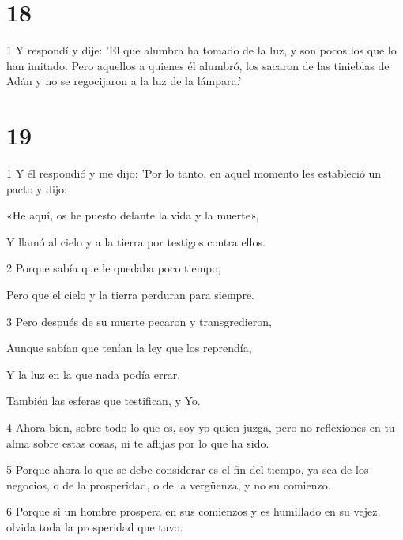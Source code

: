 \chapter{18}

\par 1 Y respondí y dije: 'El que alumbra ha tomado de la luz, y son pocos los que lo han imitado. Pero aquellos a quienes él alumbró, los sacaron de las tinieblas de Adán y no se regocijaron a la luz de la lámpara.'

\chapter{19}

\par 1 Y él respondió y me dijo: 'Por lo tanto, en aquel momento les estableció un pacto y dijo:

\par «He aquí, os he puesto delante la vida y la muerte»,

\par Y llamó al cielo y a la tierra por testigos contra ellos.

\par 2 Porque sabía que le quedaba poco tiempo,

\par Pero que el cielo y la tierra perduran para siempre.

\par 3 Pero después de su muerte pecaron y transgredieron,

\par Aunque sabían que tenían la ley que los reprendía,

\par Y la luz en la que nada podía errar,

\par También las esferas que testifican, y Yo.

\par 4 Ahora bien, sobre todo lo que es, soy yo quien juzga, pero no reflexiones en tu alma sobre estas cosas, ni te aflijas por lo que ha sido.

\par 5 Porque ahora lo que se debe considerar es el fin del tiempo, ya sea de los negocios, o de la prosperidad, o de la vergüenza, y no su comienzo.

\par 6 Porque si un hombre prospera en sus comienzos y es humillado en su vejez, olvida toda la prosperidad que tuvo.

